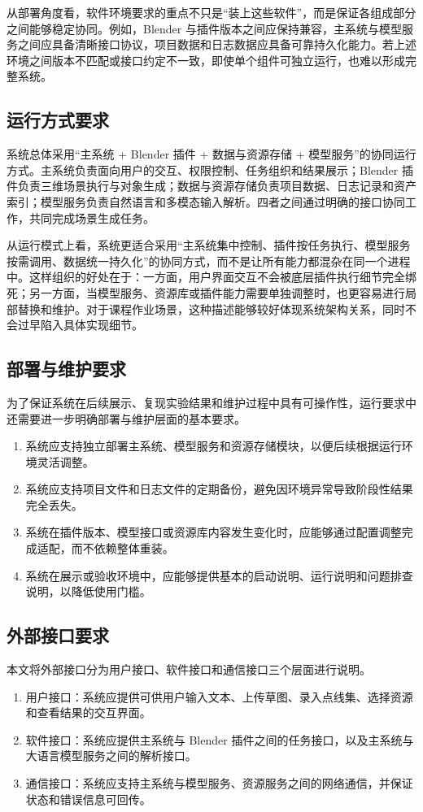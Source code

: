 \documentclass[UTF8,a4paper,10pt]{ctexart}
\begin{document}
从部署角度看，软件环境要求的重点不只是“装上这些软件”，而是保证各组成部分之间能够稳定协同。例如，Blender 与插件版本之间应保持兼容，主系统与模型服务之间应具备清晰接口协议，项目数据和日志数据应具备可靠持久化能力。若上述环境之间版本不匹配或接口约定不一致，即使单个组件可独立运行，也难以形成完整系统。

\subsection{运行方式要求}
系统总体采用“主系统 + Blender 插件 + 数据与资源存储 + 模型服务”的协同运行方式。主系统负责面向用户的交互、权限控制、任务组织和结果展示；Blender 插件负责三维场景执行与对象生成；数据与资源存储负责项目数据、日志记录和资产索引；模型服务负责自然语言和多模态输入解析。四者之间通过明确的接口协同工作，共同完成场景生成任务。

从运行模式上看，系统更适合采用“主系统集中控制、插件按任务执行、模型服务按需调用、数据统一持久化”的协同方式，而不是让所有能力都混杂在同一个进程中。这样组织的好处在于：一方面，用户界面交互不会被底层插件执行细节完全绑死；另一方面，当模型服务、资源库或插件能力需要单独调整时，也更容易进行局部替换和维护。对于课程作业场景，这种描述能够较好体现系统架构关系，同时不会过早陷入具体实现细节。

\subsection{部署与维护要求}
为了保证系统在后续展示、复现实验结果和维护过程中具有可操作性，运行要求中还需要进一步明确部署与维护层面的基本要求。
\begin{enumerate}[label=\arabic*.]
    \item 系统应支持独立部署主系统、模型服务和资源存储模块，以便后续根据运行环境灵活调整。
    \item 系统应支持项目文件和日志文件的定期备份，避免因环境异常导致阶段性结果完全丢失。
    \item 系统在插件版本、模型接口或资源库内容发生变化时，应能够通过配置调整完成适配，而不依赖整体重装。
    \item 系统在展示或验收环境中，应能够提供基本的启动说明、运行说明和问题排查说明，以降低使用门槛。
\end{enumerate}

\subsection{外部接口要求}
本文将外部接口分为用户接口、软件接口和通信接口三个层面进行说明。
\begin{enumerate}[label=\arabic*.]
    \item 用户接口：系统应提供可供用户输入文本、上传草图、录入点线集、选择资源和查看结果的交互界面。
    \item 软件接口：系统应提供主系统与 Blender 插件之间的任务接口，以及主系统与大语言模型服务之间的解析接口。
    \item 通信接口：系统应支持主系统与模型服务、资源服务之间的网络通信，并保证状态和错误信息可回传。
\end{enumerate}
\end{document}
